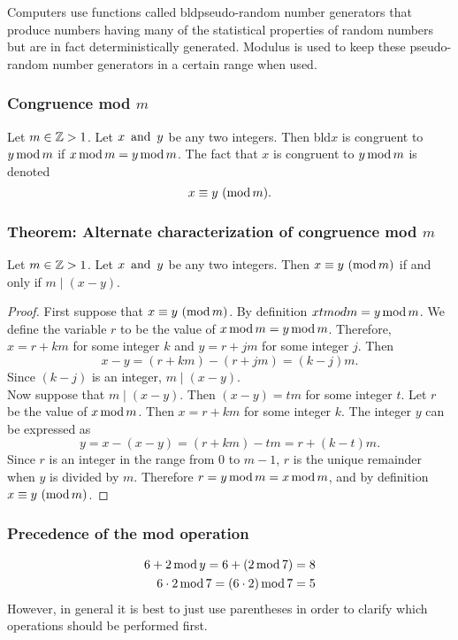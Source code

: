 Computers use functions called bld{pseudo-random number generators} that produce numbers having many of the statistical properties of random numbers but are in fact deterministically generated. Modulus is used to keep these pseudo-random number generators in a certain range when used.

\subsubsection*{Congruence mod $m$}
Let $m \in \mathbb{Z} > 1$. Let $x \operatorname{~\text{and}~} y$ be any two integers. Then bld{$x$ is congruent to $y \operatorname{\text{mod}} m$} if $x \operatorname{\text{mod}} m = y \operatorname{\text{mod}} m$. The fact that $x$ is congruent to $y \operatorname{\text{mod}} m$ is denoted
\[
  x \equiv y~(\operatorname{\text{mod}} m).
\]

\subsubsection*{Theorem: Alternate characterization of congruence mod $m$}
Let $m \in \mathbb{Z} > 1$. Let $x \operatorname{~\text{and}~} y$ be any two integers. Then $x \equiv y~(\operatorname{\text{mod}} m)$ if and only if $m \mid (x-y)$.
\begin{proof}
  First suppose that $x \equiv y~(\operatorname{\text{mod}} m)$. By definition $x tmod m = y \operatorname{\text{mod}} m$. We define the variable $r$ to be the value of $x \operatorname{\text{mod}} m = y \operatorname{\text{mod}} m$. Therefore, $x = r + km$ for some integer $k$ and $y = r + jm$ for some integer $j$. Then
  \[
    x-y = (r+km)-(r+jm) = (k-j)m.
  \]
  Since $(k-j)$ is an integer, $m\mid (x-y)$. \\
  Now suppose that $m\mid (x-y)$. Then $(x-y) = tm$ for some integer $t$. Let $r$ be the value of $x \operatorname{\text{mod}} m$. Then $x = r + km$ for some integer $k$. The integer $y$ can be expressed as
  \[
    y = x - (x-y) = (r+km)-tm = r + (k-t)m.
  \]
  Since $r$ is an integer in the range from $0$ to $m-1$, $r$ is the unique remainder when $y$ is divided by $m$. Therefore $r = y \operatorname{\text{mod}} m = x \operatorname{\text{mod}} m$, and by definition $x \equiv y~(\operatorname{\text{mod}} m)$.
\end{proof}

\subsubsection*{Precedence of the mod operation}
\begin{align*}
  6 + 2 \operatorname{\text{mod}} y = 6 + (2 \operatorname{\text{mod}} 7)         & = 8 \\
  6 \cdot 2 \operatorname{\text{mod}} 7 = (6 \cdot 2) \operatorname{\text{mod}} 7 & = 5 \\
\end{align*}
However, in general it is best to just use parentheses in order to clarify which operations should be performed first.

